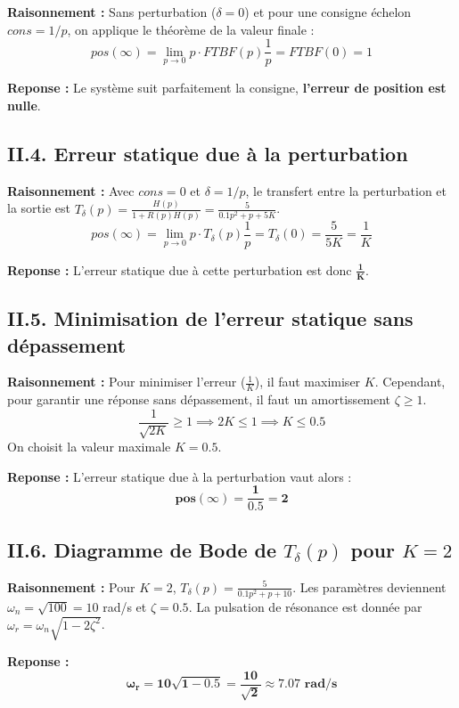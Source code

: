 \documentclass[11pt,a4paper]{article}
\begin{document}
\textbf{Raisonnement :} Sans perturbation ($\delta=0$) et pour une consigne échelon $cons = 1/p$, on applique le théorème de la valeur finale :
$$ 
pos(\infty) = \lim_{p \to 0} p \cdot FTBF(p) \frac{1}{p} = FTBF(0) = 1 
$$

\textbf{Reponse :} Le système suit parfaitement la consigne, \textbf{l'erreur de position est nulle}.

\subsection*{II.4. Erreur statique due à la perturbation}

\textbf{Raisonnement :} Avec $cons=0$ et $\delta=1/p$, le transfert entre la perturbation et la sortie est $T_\delta(p) = \frac{H(p)}{1+R(p)H(p)} = \frac{5}{0.1p^2 + p + 5K}$.
$$ 
pos(\infty) = \lim_{p \to 0} p \cdot T_\delta(p) \frac{1}{p} = T_\delta(0) = \frac{5}{5K} = \frac{1}{K} 
$$

\textbf{Reponse :} L'erreur statique due à cette perturbation est donc $\mathbf{\frac{1}{K}}$.

\subsection*{II.5. Minimisation de l'erreur statique sans dépassement}

\textbf{Raisonnement :} Pour minimiser l'erreur ($\frac{1}{K}$), il faut maximiser $K$. Cependant, pour garantir une réponse sans dépassement, il faut un amortissement $\zeta \ge 1$.
$$ 
\frac{1}{\sqrt{2K}} \ge 1 \implies 2K \le 1 \implies K \le 0.5 
$$
On choisit la valeur maximale $K = 0.5$.

\textbf{Reponse :} L'erreur statique due à la perturbation vaut alors :
$$
\mathbf{pos(\infty) = \frac{1}{0.5} = 2}
$$

\subsection*{II.6. Diagramme de Bode de $T_\delta(p)$ pour $K=2$}

\textbf{Raisonnement :} Pour $K=2$, $T_\delta(p) = \frac{5}{0.1p^2 + p + 10}$. Les paramètres deviennent $\omega_n = \sqrt{100} = 10$ rad/s et $\zeta = 0.5$. La pulsation de résonance est donnée par $\omega_r = \omega_n \sqrt{1 - 2\zeta^2}$.

\textbf{Reponse :} 
$$ 
\mathbf{\omega_r = 10 \sqrt{1 - 0.5} = \frac{10}{\sqrt{2}} \approx 7.07 \text{ rad/s}} 
$$
\end{document}
